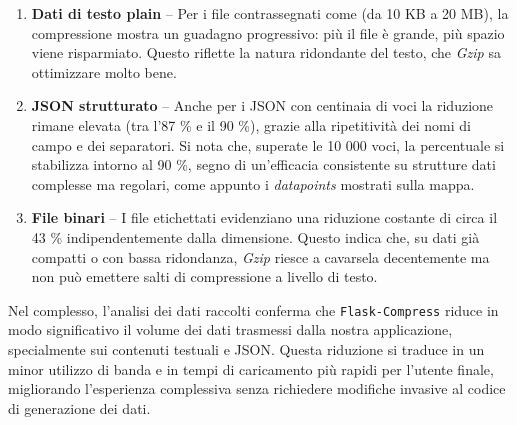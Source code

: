 \begin{enumerate}
  \item \textbf{Dati di testo plain} – Per i file contrassegnati come  (da 10 KB a 20 MB), la compressione mostra un guadagno progressivo: più il file è grande, più spazio viene risparmiato. Questo riflette la natura ridondante del testo, che \textit{Gzip} sa ottimizzare molto bene.
  
  \item \textbf{JSON strutturato} – Anche per i JSON con centinaia di voci la riduzione rimane elevata (tra l'87 \% e il 90 \%), grazie alla ripetitività dei nomi di campo e dei separatori. Si nota che, superate le 10 000 voci, la percentuale si stabilizza intorno al 90 \%, segno di un'efficacia consistente su strutture dati complesse ma regolari, come appunto i \textit{datapoints} mostrati sulla mappa.
  
  \item \textbf{File binari} – I file etichettati  evidenziano una riduzione costante di circa il 43 \% indipendentemente dalla dimensione. Questo indica che, su dati già compatti o con bassa ridondanza, \textit{Gzip} riesce a cavarsela decentemente ma non può emettere salti di compressione a livello di testo.
\end{enumerate}

Nel complesso, l'analisi dei dati raccolti conferma che \texttt{Flask-Compress} riduce in modo significativo il volume dei dati trasmessi dalla nostra applicazione, specialmente sui contenuti testuali e JSON. Questa riduzione si traduce in un minor utilizzo di banda e in tempi di caricamento più rapidi per l'utente finale, migliorando l'esperienza complessiva senza richiedere modifiche invasive al codice di generazione dei dati.

